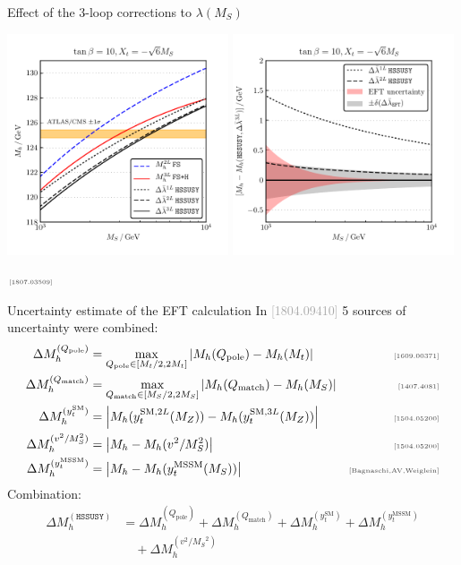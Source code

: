 \documentclass[hyperref={pdfpagelabels=false},ngerman]{beamer}
\newcommand{\MS}{\ensuremath{M_S}}
\newcommand{\mycite}[1]{\ensuremath{\text{\textcolor{darkgray}{\tiny [#1]}}}}
\newcommand{\bigcite}[1]{\textcolor{darkgray}{[#1]}}
\newcommand{\SM}{\ensuremath{\text{SM}}}
\newcommand{\MSSM}{\ensuremath{\text{MSSM}}}
\newcommand{\Qpole}{\ensuremath{Q_\text{pole}}}
\newcommand{\Qmatch}{\ensuremath{Q_\text{match}}}
\newcommand{\DMhQpole}{\ensuremath{\Delta M_h^{(\Qpole)}}}
\newcommand{\DMhQmatch}{\ensuremath{\Delta M_h^{(\Qmatch)}}}
\newcommand{\DMhHSSUSY}{\ensuremath{\Delta M_h^{(\HSSUSY)}}}
\newcommand{\DMhHSSUSYytSM}{\ensuremath{\Delta M_h^{(y_t^\SM)}}}
\newcommand{\DMhHSSUSYytMSSM}{\ensuremath{\Delta M_h^{(y_t^\MSSM)}}}
\newcommand{\DMhEFT}{\ensuremath{\Delta M_h^{(v^2/\MS^2)}}}
\def\HSSUSY{\texttt{HSSUSY}}
\begin{document}
\begin{frame}{Effect of the 3-loop corrections to $\lambda(\MS)$}
  \begin{center}
    \includegraphics[width=0.49\textwidth]{plots/HSSUSY-3L/scan_Mh_MS_TB-10_Xt--sqrt6}\hfill
    \includegraphics[width=0.49\textwidth]{plots/HSSUSY-3L/scan_Mh_MS_TB-10_Xt--sqrt6_diff.pdf}
  \end{center}
  \mycite{1807.03509}
\end{frame}

\begin{frame}{Uncertainty estimate of the EFT calculation}
  In \bigcite{1804.09410} 5 sources of uncertainty were combined:
  \begin{align*}
    \DMhQpole &= \max_{\Qpole\in[M_t/2,2M_t]}\left|M_h(\Qpole) - M_h(M_t)\right| & \text{\mycite{1609.00371}} \\
    \DMhQmatch &= \max_{\Qmatch\in[\MS/2,2\MS]}\left|M_h(\Qmatch) - M_h(\MS)\right| & \text{\mycite{1407.4081}} \\
    \DMhHSSUSYytSM &= \left| M_h(y_t^{\SM,2L}(M_Z)) - M_h(y_t^{\SM,3L}(M_Z)) \right| & \text{\mycite{1504.05200}} \\
    \DMhEFT &= \left| M_h - M_h(v^2/\MS^2) \right| & \text{\mycite{1504.05200}} \\
    \DMhHSSUSYytMSSM &= \left| M_h - M_h(y_t^\MSSM(\MS)) \right| & \text{\mycite{Bagnaschi,AV,Weiglein}}
  \end{align*}
  Combination:
  \begin{align*}
    \DMhHSSUSY &= \DMhQpole + \DMhQmatch + \DMhHSSUSYytSM + \DMhHSSUSYytMSSM \\
    &\quad + \DMhEFT
  \end{align*}
\end{frame}
\end{document}
